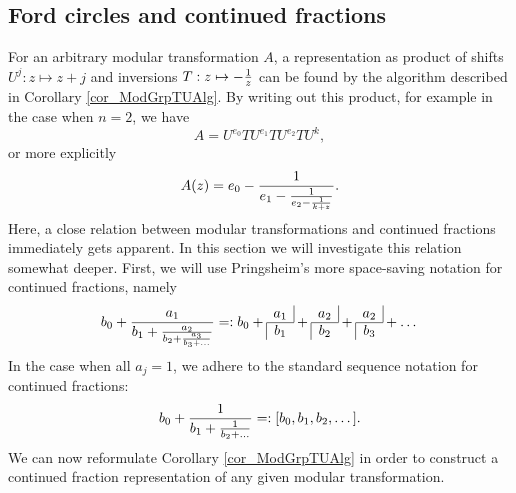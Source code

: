 \subsection{Ford circles and continued fractions}

For an arbitrary modular transformation $A$, a representation as product of shifts $U^j: z \mapsto z+j$ and inversions $T: z \mapsto -\frac{1}{z}$ can be found by the algorithm described in Corollary \ref{cor_ModGrpTUAlg}. By writing out this product, for example in the case when $n=2$, we have
\begin{equation*}
A = U^{e_0}T U^{e_1}T U^{e_2}T U^k,
\end{equation*}
or more explicitly
\begin{equation}
\label{eqn_ALongConFrac}
A(z) = e_0 - \frac{1}{e_1 - \frac{1}{e_2 - \frac{1}{k + z}}}.
\end{equation}
Here, a close relation between modular transformations and continued fractions immediately gets apparent. In this section we will investigate this relation somewhat deeper. 
First, we will use Pringsheim's more space-saving notation for continued fractions, namely
\begin{equation}
\label{eqn_ConFracNotation}
b_0 + \frac{a_1}{b_1 + \frac{a_2}{b_2 + \frac{a_3}{b_3 + \dots}}} =: 
b_0 + \cfr{a_1}{b_1} + \cfr{a_2}{b_2} + \cfr{a_2}{b_3} + \dots
\end{equation}
In the case when all $a_j = 1$, we adhere to the standard sequence notation for continued fractions:
\begin{equation*}
b_0 + \frac{1}{b_1 + \frac{1}{b_2 + \dots}} =: [b_0,b_1,b_2,\dots].
\end{equation*}
We can now reformulate Corollary \ref{cor_ModGrpTUAlg} in order to construct a continued fraction representation of any given modular transformation.

